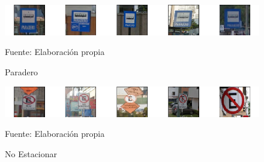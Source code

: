 			\begin{figure}[H]
				\begin{center}
				\includegraphics[width=1\textwidth]{images/desarrollo/imagenes/peru/1__(5).png}
				\end{center}
				\begin{center}
				\caption{\small{Paradero}}
				\vskip -0.25cm
				{\small{Fuente: Elaboración propia}}
				\end{center}
				\vspace{-1.5em}
			\end{figure}

			\begin{figure}[H]
				\begin{center}
				\includegraphics[width=1\textwidth]{images/desarrollo/imagenes/peru/1__(6).png}
				\end{center}
				\begin{center}
				\caption{\small{No Estacionar}}
				\vskip -0.25cm
				{\small{Fuente: Elaboración propia}}
				\end{center}
				\vspace{-1.5em}
			\end{figure}
			

